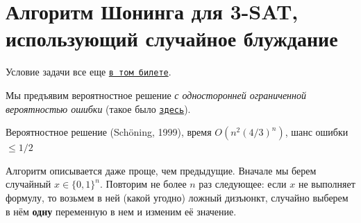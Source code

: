 \section{Алгоритм Шонинга для 3-SAT, использующий случайное блуждание}

\secauthor{\denis}

Условие задачи все еще \hyperlink{3sat}{\texttt{в том билете}}.

Мы предъявим вероятностное решение \textit{с односторонней ограниченной вероятностью ошибки} (такое было \hyperlink{Freivalds}{\texttt{здесь}}).

\begin{algodescription}{Вероятностное решение (Sch\"oning, 1999), время $O(n^2(4/3)^n)$, шанс ошибки $\leq 1/2$ }

Алгоритм описывается даже проще, чем предыдущие. Вначале мы берем случайный $x \in \{0, 1\}^n$. Повторим не более $n$ раз следующее: если $x$ не выполняет формулу, то возьмем в ней (какой угодно) ложный дизъюнкт, случайно выберем в нём \textbf{одну} переменную в нем и изменим её значение.
\end{algodescription}

